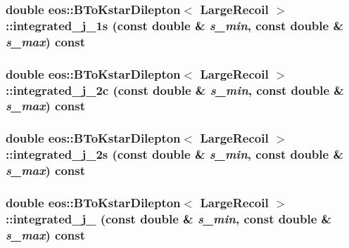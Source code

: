 \hypertarget{classeos_1_1BToKstarDilepton_3_01LargeRecoil_01_4_ab85914d06df8417561d93992ac831d5a}{
\subsubsection[{integrated\_\-j\_\-1s}]{\setlength{\rightskip}{0pt plus 5cm}double eos::BToKstarDilepton$<$ {\bf LargeRecoil} $>$::integrated\_\-j\_\-1s (const double \& {\em s\_\-min}, \/  const double \& {\em s\_\-max}) const}}
\label{classeos_1_1BToKstarDilepton_3_01LargeRecoil_01_4_ab85914d06df8417561d93992ac831d5a}
\hypertarget{classeos_1_1BToKstarDilepton_3_01LargeRecoil_01_4_a3384404d2fb165a76421d1e3d5814bf2}{
\subsubsection[{integrated\_\-j\_\-2c}]{\setlength{\rightskip}{0pt plus 5cm}double eos::BToKstarDilepton$<$ {\bf LargeRecoil} $>$::integrated\_\-j\_\-2c (const double \& {\em s\_\-min}, \/  const double \& {\em s\_\-max}) const}}
\label{classeos_1_1BToKstarDilepton_3_01LargeRecoil_01_4_a3384404d2fb165a76421d1e3d5814bf2}
\hypertarget{classeos_1_1BToKstarDilepton_3_01LargeRecoil_01_4_ac9392ba39e14592b310c6dbfa39c51dc}{
\subsubsection[{integrated\_\-j\_\-2s}]{\setlength{\rightskip}{0pt plus 5cm}double eos::BToKstarDilepton$<$ {\bf LargeRecoil} $>$::integrated\_\-j\_\-2s (const double \& {\em s\_\-min}, \/  const double \& {\em s\_\-max}) const}}
\label{classeos_1_1BToKstarDilepton_3_01LargeRecoil_01_4_ac9392ba39e14592b310c6dbfa39c51dc}
\hypertarget{classeos_1_1BToKstarDilepton_3_01LargeRecoil_01_4_a55d2a76ae67afb9a549aea69b76af846}{
\subsubsection[{integrated\_\-j\_\-3}]{\setlength{\rightskip}{0pt plus 5cm}double eos::BToKstarDilepton$<$ {\bf LargeRecoil} $>$::integrated\_\-j\_ (const double \& {\em s\_\-min}, \/  const double \& {\em s\_\-max}) const}}
